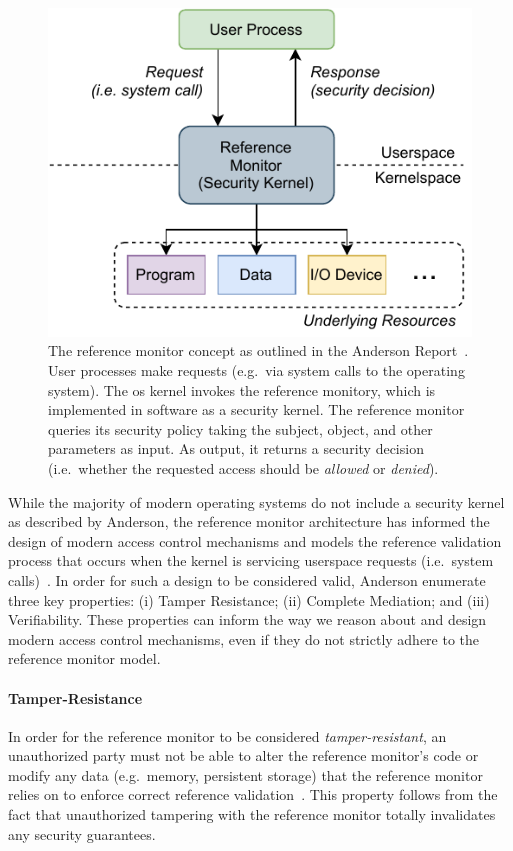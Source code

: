 \begin{figure}[tbp]
  \centering
  \includegraphics[width=0.6\linewidth]{figs/background/refmon.pdf}
  \caption[The reference monitor concept]{
    The reference monitor concept as outlined in the Anderson
    Report~\cite{anderson1972_report}. User processes make requests (e.g.~via system calls
    to the operating system). The \gls{os} kernel invokes the reference monitory, which is
    implemented in software as a security kernel. The reference monitor queries its
    security policy taking the subject, object, and other parameters as input. As output,
    it returns a security decision (i.e.~whether the requested access should be
    \textit{allowed} or \textit{denied}).
  }%
  \label{fig:refmon}
\end{figure}

While the majority of modern operating systems do not include a security kernel as
described by Anderson, the reference monitor architecture has informed the design of
modern access control mechanisms and models the reference validation process that occurs
when the kernel is servicing userspace requests (i.e.~system
calls)~\cite{van_oorschot2020_tools_jewels}. In order for such a design to be considered
valid, Anderson enumerate three key properties: (i) Tamper Resistance; (ii) Complete
Mediation; and (iii) Verifiability. These properties can inform the way we reason about
and design modern access control mechanisms, even if they do not strictly adhere to the
reference monitor model.

\paragraph*{Tamper-Resistance}

In order for the reference monitor to be considered \textit{tamper-resistant}, an unauthorized
party must not be able to alter the reference monitor's code or modify any data
(e.g.~memory, persistent storage) that the reference monitor relies on to enforce correct
reference validation~\cite{anderson1972_report}. This property follows from the fact that
unauthorized tampering with the reference monitor totally invalidates any security
guarantees.

